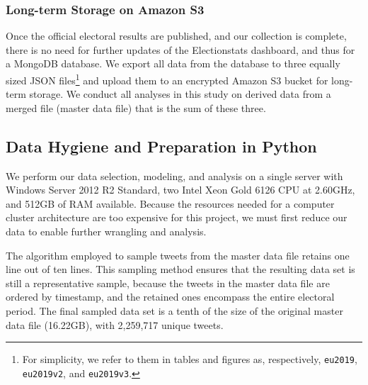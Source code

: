 \subsubsection{Long-term Storage on Amazon S3}\label{s3}
Once the official electoral results are published, and our collection is complete, there is no need for further updates of the Electionstats dashboard, and thus for a MongoDB database. We export all data from the database to three equally sized JSON files\footnote{For simplicity, we refer to them in tables and figures as, respectively, \texttt{eu2019}, \texttt{eu2019v2}, and \texttt{eu2019v3}.} and upload them to an encrypted Amazon S3 bucket for long-term storage. We conduct all analyses in this study on derived data from a merged file (master data file) that is the sum of these three.
\subsection{Data Hygiene and Preparation in Python}
We perform our data selection, modeling, and analysis on a single server with Windows Server 2012 R2 Standard, two Intel Xeon Gold 6126 CPU at 2.60GHz, and 512GB of RAM available. Because the resources needed for a computer cluster architecture are too expensive for this project, we must first reduce our data to enable further wrangling and analysis.

The algorithm employed to sample tweets from the master data file retains one line out of ten lines. This sampling method ensures that the resulting data set is still a representative sample, because the tweets in the master data file are ordered by timestamp, and the retained ones encompass the entire electoral period. The final sampled data set is a tenth of the size of the original master data file (16.22GB), with 2,259,717 unique tweets.

